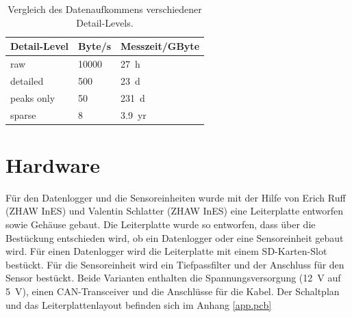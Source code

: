\begin{table}
\begin{tabular}{|l|l|l|}
\hline \textbf{Detail-Level} & \textbf{Byte/s} & Messzeit/GByte\\ 
\hline raw                   & 10000 & 27~h \\
\hline detailed              &   500 & 23~d \\
\hline peaks only            &    50 & 231~d \\
\hline sparse                &     8 & 3.9~yr \\
\hline 
\end{tabular}
\caption{Vergleich des Datenaufkommens verschiedener Detail-Levels.}
\label{table.datarate}
\end{table} 

\section{Hardware}
Für den Datenlogger und die Sensoreinheiten wurde mit der Hilfe von Erich Ruff (ZHAW InES) und Valentin Schlatter (ZHAW InES) eine Leiterplatte entworfen sowie Gehäuse gebaut. Die Leiterplatte wurde so entworfen, dass über die Bestückung entschieden wird, ob ein Datenlogger oder eine Sensoreinheit gebaut wird. Für einen Datenlogger wird die Leiterplatte mit einem SD-Karten-Slot bestückt. Für die Sensoreinheit wird ein Tiefpassfilter und der Anschluss für den Sensor bestückt. Beide Varianten enthalten die Spannungsversorgung (12~V auf 5~V), einen CAN-Transceiver und die Anschlüsse für die Kabel. Der Schaltplan und das Leiterplattenlayout befinden sich im Anhang \ref{app.pcb}